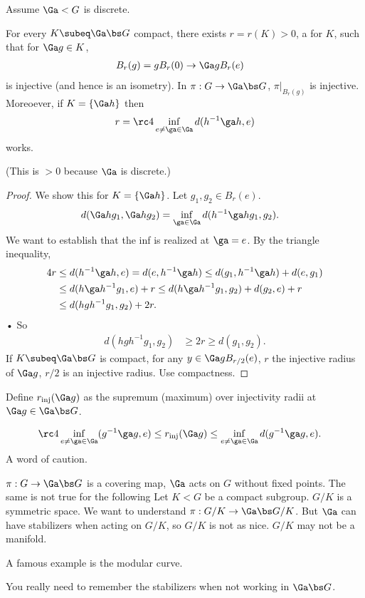Assume $\Ga < G$ is discrete. 
\begin{pr}
For every $K\subeq \Ga \bs G$ compact, there exists $r=r(K)>0$, a  for $K$, such that for $\Ga g\in K$, 
\begin{align}
B_r(g) &= gB_r(0) \to \Ga gB_r(e)
\end{align}
is injective (and hence is an isometry). In $\pi:G\to \Ga \bs G$, $\pi|_{B_r(g)}$ is injective. Moreoever, if $K=\{\Ga h\}$ then 
\begin{align}
r = \rc 4 \inf_{e\ne \ga \in \Ga} d(h^{-1}\ga h,e)
\end{align}
works.
\end{pr}
(This is $>0$ because $\Ga$ is discrete.)
\begin{proof}
We show this for $K=\{\Ga h\}$.  Let $g_1,g_2\in B_r(e)$. 
\begin{align}
d(\Ga hg_1,\Ga hg_2) &=
\inf_{\ga\in \Ga} d(h^{-1}\ga hg_1,g_2).
\end{align}
We want to establish that the inf is realized at $\ga = e$. By the triangle inequality,
\begin{align}
4r &\le d(h^{-1} \ga h, e) = d(e, h^{-1}\ga h) \le d(g_1,h^{-1}\ga h) + d(e,g_1)\\
&\le d(h\ga h^{-1} g_1,e) + r 
\le d(h\ga h^{-1} g_1,g_2) + d(g_2,e) + r\\
&\le d(hgh^{-1} g_1,g_2) + 2r.
\end{align}•
So 
\begin{align}
d(hgh^{-1}g_1, g_2)&\ge 2r \ge d(g_1,g_2).
\end{align}
If $K\subeq \Ga \bs G$ is compact, for any $y\in \Ga gB_{r/2}(e)$, $r$ the injective radius of $\Ga g$, $r/2$ is an injective radius. Use compactness.
\end{proof}
\begin{df}
Define $r_{\text{inj}}(\Ga g)$ as the supremum (maximum) over injectivity radii at $\Ga g\in \Ga \bs G$. 
\end{df}
\begin{align}
\rc 4 \inf_{e\ne \ga \in \Ga} (g^{-1}\ga g,e)
&\le r_{\text{inj}}(\Ga g) \le \inf_{e\ne \ga \in \Ga} d(g^{-1}\ga g,e).
\end{align}
A word of caution.
\begin{rem}
$\pi:G\to \Ga\bs G$ is a covering map, $\Ga$ acts on $G$ without fixed points. 
The same is not true for the following
Let $K<G$ be a compact subgroup. $G/K$ is a symmetric space. We want to understand $\pi: G/K \to \Ga\bs G /K$. But $\Ga$ can have stabilizers when acting on $G/K$, so $G/K$ is not as nice. $G/K$ may not be a manifold. 

A famous example is the modular curve.

You really need to remember the stabilizers when not working in $\Ga\bs G$. 
\end{rem}
